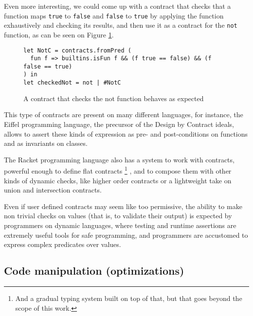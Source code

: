 \documentclass[sigplan,10pt,review,anonymous]{acmart}
\newcommand{\info}[2][1=]{}
\newcommand{\resolved}[2]{}
\newcommand{\nickel}[1]{\lstinline[language=nickel]{#1}}
\begin{document}
Even more interesting, we could come up with a contract that checks that a function
maps \nickel{true} to \nickel{false} and \nickel{false} to \nickel{true}
by applying the function exhaustively and checking its results,
and then use it as a contract for the \nickel{not} function, as can be seen on Figure
\ref{fig:checked-not}.

\begin{figure}[h]
  \begin{center}
\begin{lstlisting}[language=nickel]
let NotC = contracts.fromPred (
  fun f => builtins.isFun f && (f true == false) && (f false == true)
) in
let checkedNot = not | #NotC
\end{lstlisting}
\end{center}
\caption{A contract that checks the not function behaves as expected}
\label{fig:checked-not}
\end{figure}

This type of contracts are present on many different languages,
for instance, the Eiffel programming language\cite{meyer1987eiffel}, the precursor
of the Design by Contract ideals, allows to assert
these kinds of expression as pre- and post-conditions on
functions and as invariants on classes\cite{EiffelDesignByContract}.
\resolved{I (Arnaud) believe Eiffel has this feature as well,
  doesn't it? (Teo) You're right},


The Racket programming language also has a system to work with
contracts, powerful enough to define flat contracts
\footnote{And a gradual typing system
built on top of that, but that goes beyond the scope of this
work.}
, and
to compose them with other kinds of dynamic checks,
like higher order contracts or a lightweight take on union
and intersection contracts\cite{RacketContracts}.

Even if user defined contracts may seem like too permissive, the ability to make
non trivial checks on values (that is, to validate their output) is expected
by programmers on dynamic languages, where testing and runtime
assertions are extremely useful tools for safe programming, and
programmers are accustomed to express complex predicates
over values.


\subsection*{Code manipulation (optimizations)}
\label{sec:optimizations}
\info{Present inlining and CSE as two major code
optimizations.
Purity and immutability as two important factors.}
\end{document}
